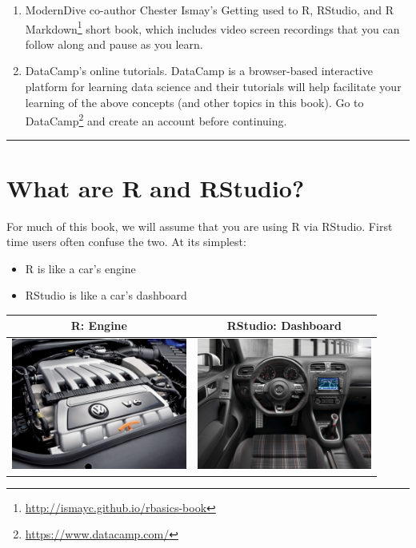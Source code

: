 \documentclass[12pt,]{krantz}
\providecommand{\tightlist}{%
  \setlength{\itemsep}{0pt}\setlength{\parskip}{0pt}}
\renewcommand{\href}[2]{#2\footnote{\url{#1}}}
\begin{document}
\begin{enumerate}
\def\labelenumi{\arabic{enumi}.}
\tightlist
\item
  ModernDive co-author Chester Ismay's
  \href{http://ismayc.github.io/rbasics-book}{Getting used to R,
  RStudio, and R Markdown} \citep{usedtor2016} short book, which
  includes video screen recordings that you can follow along and pause
  as you learn.
\item
  DataCamp's online tutorials. DataCamp is a browser-based interactive
  platform for learning data science and their tutorials will help
  facilitate your learning of the above concepts (and other topics in
  this book). Go to \href{https://www.datacamp.com/}{DataCamp} and
  create an account before continuing.
\end{enumerate}

\begin{center}\rule{0.5\linewidth}{\linethickness}\end{center}

\section{What are R and RStudio?}\label{what-are-r-and-rstudio}

For much of this book, we will assume that you are using R via RStudio.
First time users often confuse the two. At its simplest:

\begin{itemize}
\tightlist
\item
  R is like a car's engine
\item
  RStudio is like a car's dashboard
\end{itemize}

\begin{longtable}[]{@{}cc@{}}
\toprule
R: Engine & RStudio: Dashboard\tabularnewline
\midrule
\endhead
\includegraphics[height=1.70000in]{images/engine.jpg} &
\includegraphics[height=1.70000in]{images/dashboard.jpg}\tabularnewline
\bottomrule
\end{longtable}
\end{document}
